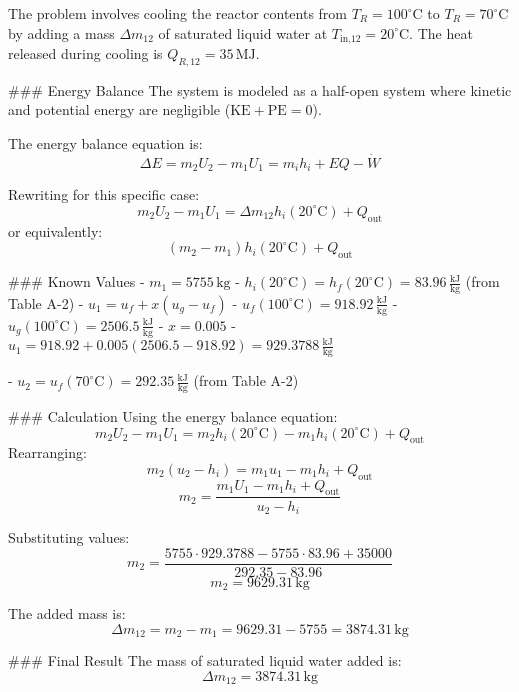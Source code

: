 The problem involves cooling the reactor contents from \( T_R = 100^\circ\text{C} \) to \( T_R = 70^\circ\text{C} \) by adding a mass \( \Delta m_{12} \) of saturated liquid water at \( T_{\text{in,12}} = 20^\circ\text{C} \). The heat released during cooling is \( Q_{R,12} = 35 \, \text{MJ} \).  

### Energy Balance  
The system is modeled as a half-open system where kinetic and potential energy are negligible (\( \text{KE} + \text{PE} = 0 \)).  

The energy balance equation is:  
\[
\Delta E = m_2 U_2 - m_1 U_1 = m_i h_i + EQ - \dot{W}
\]  

Rewriting for this specific case:  
\[
m_2 U_2 - m_1 U_1 = \Delta m_{12} h_i(20^\circ\text{C}) + Q_{\text{out}}
\]  
or equivalently:  
\[
(m_2 - m_1) h_i(20^\circ\text{C}) + Q_{\text{out}}
\]  

### Known Values  
- \( m_1 = 5755 \, \text{kg} \)  
- \( h_i(20^\circ\text{C}) = h_f(20^\circ\text{C}) = 83.96 \, \frac{\text{kJ}}{\text{kg}} \) (from Table A-2)  
- \( u_1 = u_f + x(u_g - u_f) \)  
  - \( u_f(100^\circ\text{C}) = 918.92 \, \frac{\text{kJ}}{\text{kg}} \)  
  - \( u_g(100^\circ\text{C}) = 2506.5 \, \frac{\text{kJ}}{\text{kg}} \)  
  - \( x = 0.005 \)  
  - \( u_1 = 918.92 + 0.005(2506.5 - 918.92) = 929.3788 \, \frac{\text{kJ}}{\text{kg}} \)  

- \( u_2 = u_f(70^\circ\text{C}) = 292.35 \, \frac{\text{kJ}}{\text{kg}} \) (from Table A-2)  

### Calculation  
Using the energy balance equation:  
\[
m_2 U_2 - m_1 U_1 = m_2 h_i(20^\circ\text{C}) - m_1 h_i(20^\circ\text{C}) + Q_{\text{out}}
\]  
Rearranging:  
\[
m_2 (u_2 - h_i) = m_1 u_1 - m_1 h_i + Q_{\text{out}}
\]  
\[
m_2 = \frac{m_1 U_1 - m_1 h_i + Q_{\text{out}}}{u_2 - h_i}
\]  

Substituting values:  
\[
m_2 = \frac{5755 \cdot 929.3788 - 5755 \cdot 83.96 + 35000}{292.35 - 83.96}
\]  
\[
m_2 = 9629.31 \, \text{kg}
\]  

The added mass is:  
\[
\Delta m_{12} = m_2 - m_1 = 9629.31 - 5755 = 3874.31 \, \text{kg}
\]  

### Final Result  
The mass of saturated liquid water added is:  
\[
\Delta m_{12} = 3874.31 \, \text{kg}
\]